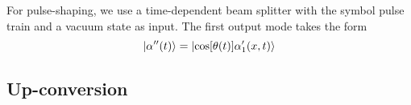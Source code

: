 For pulse-shaping, we use a time-dependent beam splitter with the symbol pulse train and a vacuum state as input.
The first output mode takes the form
\begin{equation}
	\ket{\alpha^{\prime\prime}(t)}
	=
	\ket{\cos[\theta(t)]\alpha_1^\prime(x,t)}
\end{equation}


\FloatBarrier
\subsection{Up-conversion}

